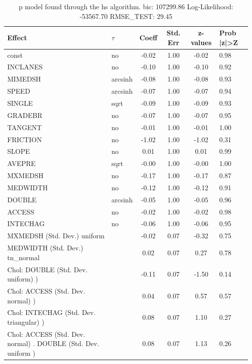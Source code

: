 \begin{table}
	\caption{p model found through the hs algorithm. bic: 107299.86 Log-Likelihood: -53567.70 RMSE_TEST: 29.45}
	\begin{center}
		\begin{tabular}{|l|l|c|c|c|l|}
			\hline
			Effect & $\tau$ & Coeff & Std. Err & z-values & Prob |z|>Z \\
			\hline
			const & no & -0.02 & 1.00 & -0.02 & 0.98 \\
			\hline
			INCLANES & no & -0.10 & 1.00 & -0.10 & 0.92 \\
			\hline
			MIMEDSH & arcsinh & -0.08 & 1.00 & -0.08 & 0.93 \\
			\hline
			SPEED & arcsinh & -0.07 & 1.00 & -0.07 & 0.94 \\
			\hline
			SINGLE & sqrt & -0.09 & 1.00 & -0.09 & 0.93 \\
			\hline
			GRADEBR & no & -0.07 & 1.00 & -0.07 & 0.95 \\
			\hline
			TANGENT & no & -0.01 & 1.00 & -0.01 & 1.00 \\
			\hline
			FRICTION & no & -1.02 & 1.00 & -1.02 & 0.31 \\
			\hline
			SLOPE & no & 0.01 & 1.00 & 0.01 & 0.99 \\
			\hline
			AVEPRE & sqrt & -0.00 & 1.00 & -0.00 & 1.00 \\
			\hline
			MXMEDSH & no & -0.17 & 1.00 & -0.17 & 0.87 \\
			\hline
			MEDWIDTH & no & -0.12 & 1.00 & -0.12 & 0.91 \\
			\hline
			DOUBLE & arcsinh & -0.05 & 1.00 & -0.05 & 0.96 \\
			\hline
			ACCESS & no & -0.02 & 1.00 & -0.02 & 0.98 \\
			\hline
			INTECHAG & no & -0.06 & 1.00 & -0.06 & 0.95 \\
			\hline
			MXMEDSH (Std. Dev.) uniform &  & -0.02 & 0.07 & -0.32 & 0.75 \\
			\hline
			MEDWIDTH (Std. Dev.) tn_normal &  & 0.02 & 0.07 & 0.27 & 0.78 \\
			\hline
			 Chol: DOUBLE (Std. Dev. uniform) ) &  & -0.11 & 0.07 & -1.50 & 0.14 \\
			\hline
			 Chol: ACCESS (Std. Dev. normal) ) &  & 0.04 & 0.07 & 0.57 & 0.57 \\
			\hline
			 Chol: INTECHAG (Std. Dev. triangular) ) &  & 0.08 & 0.07 & 1.10 & 0.27 \\
			\hline
			 Chol: ACCESS (Std. Dev. normal) . DOUBLE (Std. Dev.   uniform ) &  & 0.08 & 0.07 & 1.13 & 0.26 \\

\end{tabular}
\end{center}
\end{table}
